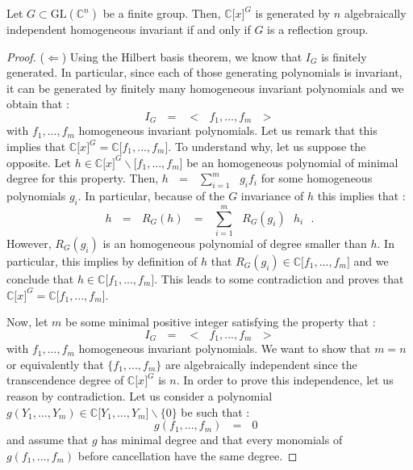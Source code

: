 \documentclass[envcountsame,envcountchap]{svmono}
\newcommand{\C}{\mathbb C}
\newcommand{\sub}{\subset}
\newcommand{\lb}{\lbrack}
\newcommand{\rb}{\rbrack}
\newcommand{\s}[2]{\sum\limits_{#1}^{#2}}
\newcommand{\qq}{\text{ }}
\begin{document}
\begin{theorem}
	Let $G\sub \mbox{GL}(\C^n)$ be a finite group. Then, $\C \lb x\rb^G$ is generated by $n$ algebraically independent homogeneous invariant if and only if $G$ is a reflection group. 
\end{theorem}
\begin{proof}
	($\Leftarrow$) Using the Hilbert basis theorem, we know that $I_G$ is finitely generated. In particular, since each of those generating polynomials is invariant, it can be generated by finitely many homogeneous invariant polynomials and we obtain that :
	\begin{equation}
	I_G \qq=\qq < \qq f_1,..., f_m\qq >
	\end{equation}
	with $f_1,..., f_m$ homogeneous invariant polynomials. Let us remark that this implies that $\C \lb x \rb^G=\C \lb f_1,..., f_m\rb$. To understand why, let us suppose the opposite. Let $h\in \C \lb x \rb^G\backslash \lb f_1,..., f_m \rb$ be an homogeneous polynomial of minimal degree for this property. Then, $h\qq=\qq \s{i=1}{m} \qq g_i f_i$ for some homogeneous polynomials $g_i$. In particular, because of the $G$ invariance of $h$ this implies that :
	\begin{equation}
	h\qq=\qq R_G (h)\qq=\qq \s{i=1}{m}\qq R_G (g_i)\qq h_i\qq .
	\end{equation} 
	However, $R_G(g_i)$ is an homogeneous polynomial of degree smaller than $h$. In particular, this implies by definition of $h$ that $R_G(g_i)\in \C \lb f_1,..., f_m \rb$ and we conclude that $h\in  \C \lb f_1,..., f_m \rb$. This leads to some contradiction and proves that $\C\lb x\rb^G =\C \lb f_1,..., f_m\rb$.
	
	Now, let $m$ be some minimal positive integer satisfying the property that :
	\begin{equation}
	I_G \qq=\qq < \qq f_1,..., f_m\qq >
	\end{equation}
	with $f_1,..., f_m$ homogeneous invariant polynomials. We want to show that $m=n$ or equivalently that $\{f_1,..., f_m\}$ are algebraically independent since the transcendence degree of $\C \lb x\rb^G$ is $n$. In order to prove this independence, let us reason by contradiction. Let us consider a polynomial $g(Y_1,..., Y_m)\in \C \lb Y_1,..., Y_m\rb \backslash \{0\}$ be such that :
	\begin{equation}
	g(f_1,..., f_m)\qq=\qq 0\qq
	\end{equation}
	and assume that $g$ has minimal degree and that every monomials of $g(f_1,..., f_m)$ before cancellation have the same degree.
	

\end{proof}
\end{document}
